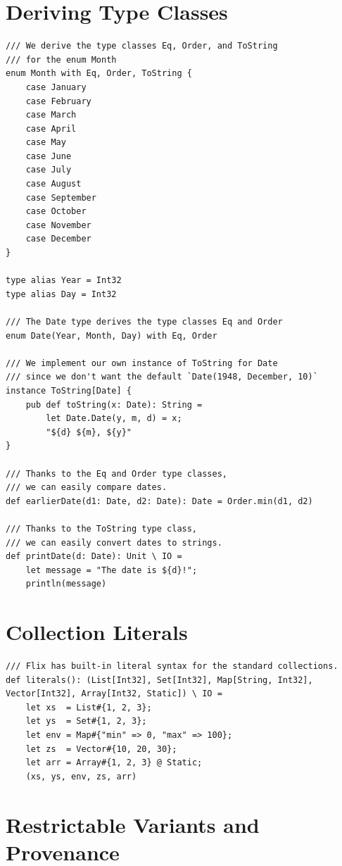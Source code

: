 \documentclass{article}
\begin{document}
\section{Deriving Type Classes}
\begin{lstlisting}
/// We derive the type classes Eq, Order, and ToString
/// for the enum Month
enum Month with Eq, Order, ToString {
    case January
    case February
    case March
    case April
    case May
    case June
    case July
    case August
    case September
    case October
    case November
    case December
}

type alias Year = Int32
type alias Day = Int32

/// The Date type derives the type classes Eq and Order
enum Date(Year, Month, Day) with Eq, Order

/// We implement our own instance of ToString for Date
/// since we don't want the default `Date(1948, December, 10)`
instance ToString[Date] {
    pub def toString(x: Date): String =
        let Date.Date(y, m, d) = x;
        "${d} ${m}, ${y}"
}

/// Thanks to the Eq and Order type classes,
/// we can easily compare dates.
def earlierDate(d1: Date, d2: Date): Date = Order.min(d1, d2)

/// Thanks to the ToString type class,
/// we can easily convert dates to strings.
def printDate(d: Date): Unit \ IO =
    let message = "The date is ${d}!";
    println(message)
\end{lstlisting}

\section{Collection Literals}

\begin{lstlisting}
/// Flix has built-in literal syntax for the standard collections.
def literals(): (List[Int32], Set[Int32], Map[String, Int32], Vector[Int32], Array[Int32, Static]) \ IO =
    let xs  = List#{1, 2, 3};
    let ys  = Set#{1, 2, 3};
    let env = Map#{"min" => 0, "max" => 100};
    let zs  = Vector#{10, 20, 30};
    let arr = Array#{1, 2, 3} @ Static;
    (xs, ys, env, zs, arr)
\end{lstlisting}

\section{Restrictable Variants and Provenance}
\end{document}
